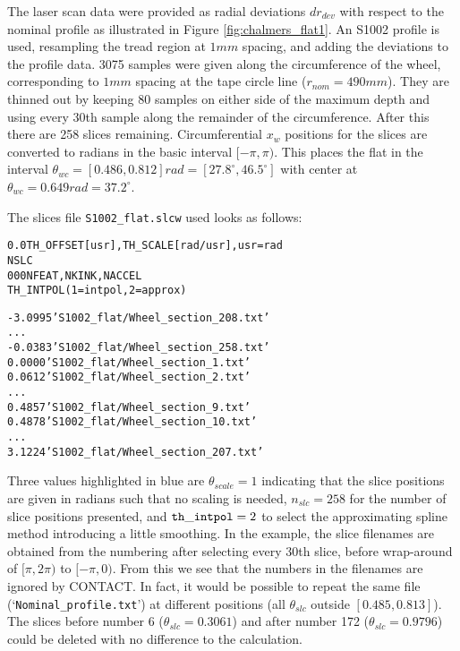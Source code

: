 \documentclass[12pt]{report}
\begin{document}
The laser scan data were provided as radial deviations $dr_{dev}$ with
respect to the nominal profile as illustrated in Figure
\ref{fig:chalmers_flat1}. An S1002 profile is used, resampling the tread
region at $1\unit{mm}$ spacing, and adding the deviations to the profile
data. 3075 samples were given along the circumference
of the wheel, corresponding to $1\unit{mm}$ spacing at the tape circle
line ($r_{nom}=490\unit{mm}$). They are thinned out by keeping 80
samples on either side of the maximum depth and using every 30th sample
along the remainder of the circumference. After this there are 258 slices
remaining. Circumferential $x_w$ positions for the slices are converted
to radians in the basic interval $[-\pi,\pi)$. This
places the flat in the interval $\theta_{wc}=[0.486,0.812]\unit{rad}=
[27.8^\circ,46.5^\circ]$ with center at $\theta_{wc}=0.649\unit{rad}=
37.2^\circ$.

The slices file {\tt S1002\_flat.slcw} used looks as follows:

\begin{alltt}\small
% wheel flat on S1002 profile, 
% data courtesy M. Maglio / Chalmers University of Technology

     0.0          TH_OFFSET [usr], TH_SCALE [rad/usr], usr=rad
                  NSLC
       0    0    0   NFEAT, NKINK, NACCEL
                    TH_INTPOL (1=intpol, 2=approx)

% slice positions TH_SLC [usr] and filenames WFNAME per slice

   -3.0995   'S1002_flat/Wheel_section_208.txt'
              ...
   -0.0383   'S1002_flat/Wheel_section_258.txt'
    0.0000   'S1002_flat/Wheel_section_1.txt'
    0.0612   'S1002_flat/Wheel_section_2.txt'
              ...
    0.4857   'S1002_flat/Wheel_section_9.txt'   % start of wheel flat
    0.4878   'S1002_flat/Wheel_section_10.txt'
              ...
    3.1224   'S1002_flat/Wheel_section_207.txt'
\end{alltt}

Three values highlighted in blue are $\theta_{scale}=1$ indicating
that the slice positions are given in radians such that no scaling is
needed, $n_{slc}=258$ for the number of slice positions presented, and
${\tt th\_intpol}=2$ to select the approximating spline method introducing a
little smoothing. In the example, the slice filenames are obtained from the
numbering after selecting every 30th slice, before wrap-around of
$[\pi,2\pi)$ to $[-\pi,0)$. From this we see that the numbers in the
filenames are ignored by CONTACT. In fact, it would be possible to
repeat the same file (`{\tt Nominal\_profile.txt}') at different positions
(all $\theta_{slc}$ outside $[0.485,0.813]$). The slices before number 6
($\theta_{slc}=0.3061$) and after number 172 ($\theta_{slc}=0.9796$) could
be deleted with no difference to the calculation.
\end{document}
